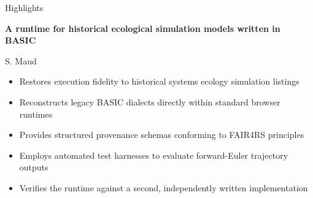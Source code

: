 \documentclass[11pt,a4paper]{article}
\begin{document}
{\Large Highlights}

\vskip12pt
\noindent\textbf{A runtime for historical ecological simulation models written in BASIC}

\vskip6pt
\noindent S. Maud

\medskip
\begin{itemize}
\item Restores execution fidelity to historical systems ecology simulation listings
\item Reconstructs legacy BASIC dialects directly within standard browser runtimes
\item Provides structured provenance schemas conforming to FAIR4RS principles
\item Employs automated test harnesses to evaluate forward-Euler trajectory outputs
\item Verifies the runtime against a second, independently written implementation
\end{itemize}
\end{document}
